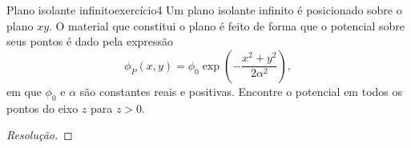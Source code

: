 \begin{exercício}{Plano isolante infinito}{exercício4}
    Um plano isolante infinito é posicionado sobre o plano \(xy\). O material que constitui o plano é feito de forma que o potencial sobre seus pontos é dado pela expressão
    \begin{equation*}
        \phi_P(x,y) = \phi_0 \exp\left(- \frac{x^2 + y^2}{2 \alpha^2}\right),
    \end{equation*}
    em que \(\phi_0\) e \(\alpha\) são constantes reais e positivas. Encontre o potencial em todos os pontos do eixo \(z\) para \(z > 0\).
\end{exercício}
\begin{proof}[Resolução]

\end{proof}
